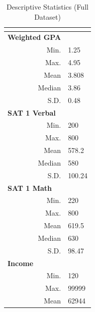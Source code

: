\documentclass[titlepage]{article}   	%
\begin{document}
\begin{table}[]
\centering
\caption{Descriptive Statistics (Full Dataset)}
\label{my-label}
\begin{tabular}{@{}rl@{}}
\toprule
\multicolumn{1}{l}{}                             &          \\ \midrule
\multicolumn{1}{l}{\textbf{Weighted GPA}}        &          \\
Min.                                             & 1.25     \\
Max.                                             & 4.95     \\
Mean                                             & 3.808    \\
Median                                           & 3.86     \\
S.D.                                             & 0.48     \\
\multicolumn{1}{l}{\textbf{SAT 1 Verbal}}        &          \\
Min.                                             & 200      \\
Max.                                             & 800      \\
Mean                                             & 578.2    \\
Median                                           & 580      \\
S.D.                                             & 100.24   \\
\multicolumn{1}{l}{\textbf{SAT 1 Math}}          &          \\
Min.                                             & 220      \\
Max.                                             & 800      \\
Mean                                             & 619.5    \\
Median                                           & 630      \\
S.D.                                             & 98.47    \\
\multicolumn{1}{l}{\textbf{Income}}              &          \\
Min.                                             & 120      \\
Max.                                             & 99999    \\
Mean                                             & 62944    \\

\end{tabular}
\end{table}
\end{document}
